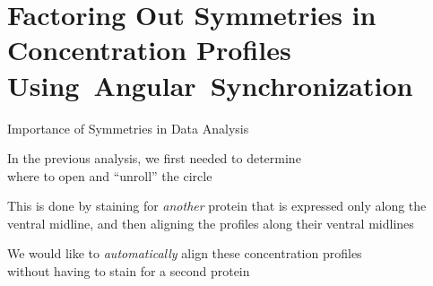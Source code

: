 \section[Concentration Profiles and Angular synchronization]{Factoring Out Symmetries in Concentration Profiles Using~Angular~Synchronization}

\begin{frame}{Importance of Symmetries in Data Analysis}

	\centering
	In the previous analysis, we first needed to determine \\where to open and ``unroll'' the circle
	
	\centering
	
	This is done by staining for {\em another} protein that is expressed only along the ventral midline, and then aligning the profiles along their ventral midlines
	
	\vspace{0.2in}
	We would like to {\em automatically} align these concentration profiles\\
	without having to stain for a second protein

\end{frame}

